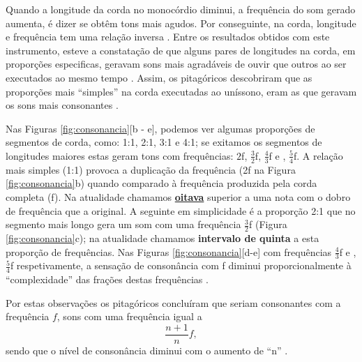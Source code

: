 Quando a longitude da corda no monocórdio diminui, 
a frequência do som gerado aumenta, é dizer se obtêm tons mais agudos.
Por conseguinte, na corda, longitude e frequência tem uma relação inversa \cite[pp. 12]{arbones2012armonia}. 
Entre os resultados obtidos com este instrumento, 
esteve a constatação de que alguns pares de longitudes na corda, em proporções especificas, 
geravam sons mais agradáveis de ouvir que outros 
ao ser executados ao mesmo tempo \cite[pp. 12]{arbones2012armonia}.
Assim, os pitagóricos descobriram que as proporções mais ``simples'' na corda executadas ao uníssono,
eram as que geravam os sons mais consonantes \cite[pp. 12]{arbones2012armonia}.

Nas Figuras \ref{fig:consonancia}[b - e], podemos ver algumas proporções de segmentos de corda,
como: 1:1, 2:1, 3:1 e 4:1; se exitamos os segmentos de longitudes maiores estas geram tons com frequências: 
$2$f, $\frac{3}{2}$f, $\frac{4}{3}$f e , $\frac{5}{4}$f.
A relação mais simples (1:1) provoca a duplicação da frequência (2f na Figura \ref{fig:consonancia}b)
quando comparado à frequência produzida pela corda completa (f). 
Na atualidade 
chamamos \hyperref[sec:pos:Oitava]{\textbf{oitava}} superior a uma nota com o dobro de frequência que a original. 
A seguinte em simplicidade é a proporção 2:1 que no segmento mais longo gera um som com uma frequência $\frac{3}{2}$f (Figura \ref{fig:consonancia}c);
na atualidade chamamos \textbf{intervalo de quinta} a esta proporção de frequências.
Nas Figuras \ref{fig:consonancia}[d-e] com frequências $\frac{4}{3}$f e , $\frac{5}{4}$f respetivamente,
a sensação de consonância com f diminui proporcionalmente à ``complexidade'' das frações destas frequências \cite[pp. 12]{arbones2012armonia}.

Por estas observações os pitagóricos concluíram que seriam consonantes com a frequência $f$, sons com uma frequência igual a 
\begin{equation}
\label{eq:simplespita}
\frac{n+1}{n}f,
\end{equation}
sendo que o nível de consonância diminui com o aumento de ``n'' \cite[pp. 14]{arbones2012armonia}.

\label{ref:paginadiatonicanumerica}

